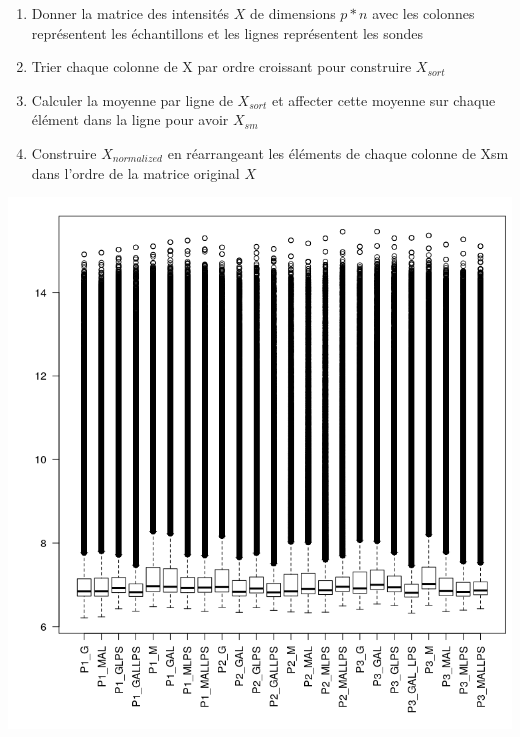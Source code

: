 \documentclass[a4paper,10pt]{article}
\begin{document}
\begin{enumerate}
 \item Donner la matrice des intensités $X$ de dimensions $p * n$ avec les colonnes représentent les échantillons et les lignes représentent les sondes
\item Trier chaque colonne de X par ordre croissant pour construire $X_{sort}$
\item Calculer la moyenne par ligne de $X_{sort}$ et affecter cette moyenne sur chaque élément dans la ligne pour avoir $X_{sm}$
\item Construire $X_{normalized}$ en réarrangeant  les éléments de chaque colonne de Xsm dans l’ordre de la matrice  original $X$
\end{enumerate}
\begin{center}
 \includegraphics[scale=0.5]{../../R/output/boxplotbeforeNorm.png}
\end{center}
\end{document}
